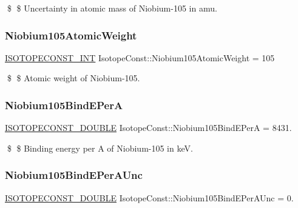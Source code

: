 \$ \$ Uncertainty in atomic mass of Niobium-\/105 in amu. \mbox{\label{group___isotope_const-_niobium-_nb105_gaf3ed39158c5590fdd571b5c506982c17}} 
\subsubsection{\texorpdfstring{Niobium105\+Atomic\+Weight}{Niobium105AtomicWeight}}
{\footnotesize\ttfamily \mbox{\hyperlink{group___isotope_const-_macros_ga5f18360b3e99483a35c32d789e62621c}{I\+S\+O\+T\+O\+P\+E\+C\+O\+N\+S\+T\+\_\+\+I\+NT}} Isotope\+Const\+::\+Niobium105\+Atomic\+Weight = 105}

\$ \$ Atomic weight of Niobium-\/105. \mbox{\label{group___isotope_const-_niobium-_nb105_ga52ad13436a3a42f48baeeaf2083334d0}} 
\subsubsection{\texorpdfstring{Niobium105\+Bind\+E\+PerA}{Niobium105BindEPerA}}
{\footnotesize\ttfamily \mbox{\hyperlink{group___isotope_const-_macros_ga8f45a7272ce02c0b4c65c44636ed719a}{I\+S\+O\+T\+O\+P\+E\+C\+O\+N\+S\+T\+\_\+\+D\+O\+U\+B\+LE}} Isotope\+Const\+::\+Niobium105\+Bind\+E\+PerA = 8431.}

\$ \$ Binding energy per A of Niobium-\/105 in keV. \mbox{\label{group___isotope_const-_niobium-_nb105_ga72c70179b9e5125d2319a0d7aee1f039}} 
\subsubsection{\texorpdfstring{Niobium105\+Bind\+E\+Per\+A\+Unc}{Niobium105BindEPerAUnc}}
{\footnotesize\ttfamily \mbox{\hyperlink{group___isotope_const-_macros_ga8f45a7272ce02c0b4c65c44636ed719a}{I\+S\+O\+T\+O\+P\+E\+C\+O\+N\+S\+T\+\_\+\+D\+O\+U\+B\+LE}} Isotope\+Const\+::\+Niobium105\+Bind\+E\+Per\+A\+Unc = 0.}

